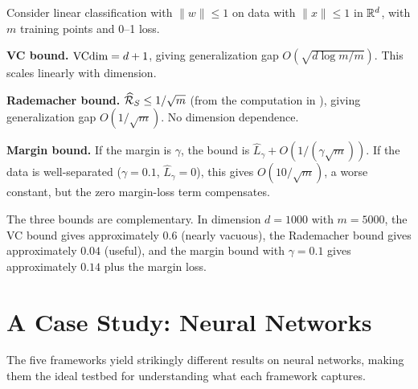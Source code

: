 \begin{example}
\label{ex:three-bounds}
Consider linear classification with $\|w\| \leq 1$ on data with
$\|x\| \leq 1$ in $\mathbb{R}^d$, with $m$ training points and 0--1 loss.

\textbf{VC bound.}  $\mathrm{VCdim} = d+1$, giving generalization gap
$O(\sqrt{d \log m / m})$.  This scales linearly with dimension.

\textbf{Rademacher bound.}  $\widehat{\mathcal{R}}_S \leq 1/\sqrt{m}$
(from the computation in ), giving generalization
gap $O(1/\sqrt{m})$.  No dimension dependence.

\textbf{Margin bound.}  If the margin is $\gamma$, the bound is
$\hat{L}_\gamma + O(1/(\gamma\sqrt{m}))$.  If the data is
well-separated ($\gamma = 0.1$, $\hat{L}_\gamma = 0$), this gives
$O(10/\sqrt{m})$, a worse constant, but the zero margin-loss term
compensates.

The three bounds are complementary.  In dimension $d = 1000$ with
$m = 5000$, the VC bound gives approximately $0.6$ (nearly vacuous), the
Rademacher bound gives approximately $0.04$ (useful), and the margin
bound with $\gamma = 0.1$ gives approximately $0.14$ plus the margin
loss.
\end{example}



\section{A Case Study: Neural Networks}
\label{sec:nn-comparison}

The five frameworks yield strikingly different results on neural
networks, making them the ideal testbed for understanding what each
framework captures.

